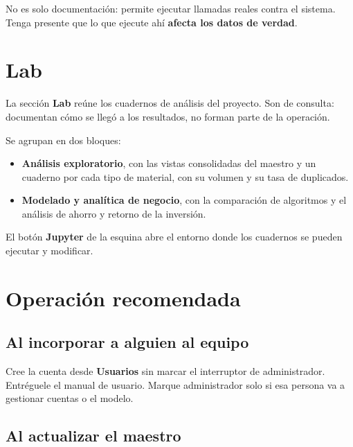 \begin{nota}
No es solo documentación: permite ejecutar llamadas reales contra el sistema.
Tenga presente que lo que ejecute ahí \textbf{afecta los datos de verdad}.
\end{nota}

\newpage
\section{Lab}

La sección \textbf{Lab} reúne los cuadernos de análisis del proyecto. Son de
consulta: documentan cómo se llegó a los resultados, no forman parte de la
operación.


Se agrupan en dos bloques:

\begin{itemize}[leftmargin=*, itemsep=3pt]
  \item \textbf{Análisis exploratorio}, con las vistas consolidadas del maestro
        y un cuaderno por cada tipo de material, con su volumen y su tasa de
        duplicados.
  \item \textbf{Modelado y analítica de negocio}, con la comparación de
        algoritmos y el análisis de ahorro y retorno de la inversión.
\end{itemize}

El botón \textbf{Jupyter} de la esquina abre el entorno donde los cuadernos se
pueden ejecutar y modificar.

\newpage
\section{Operación recomendada}

\subsection{Al incorporar a alguien al equipo}

Cree la cuenta desde \textbf{Usuarios} sin marcar el interruptor de
administrador. Entréguele el manual de usuario. Marque administrador solo si esa
persona va a gestionar cuentas o el modelo.

\subsection{Al actualizar el maestro}

